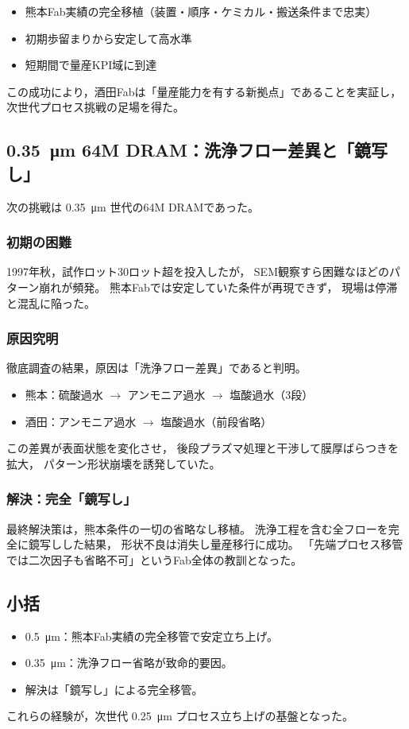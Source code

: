 \documentclass[conference]{IEEEtran}
\let\meter\metre
\begin{document}
\begin{itemize}
  \item 熊本Fab実績の完全移植（装置・順序・ケミカル・搬送条件まで忠実）
  \item 初期歩留まりから安定して高水準
  \item 短期間で量産KPI域に到達
\end{itemize}

この成功により，酒田Fabは「量産能力を有する新拠点」であることを実証し，
次世代プロセス挑戦の足場を得た。

\subsection{\SI{0.35}{\micro\meter} 64M DRAM：洗浄フロー差異と「鏡写し」}
次の挑戦は \SI{0.35}{\micro\meter} 世代の64M DRAMであった。

\subsubsection*{初期の困難}
1997年秋，試作ロット30ロット超を投入したが，
SEM観察すら困難なほどのパターン崩れが頻発。
熊本Fabでは安定していた条件が再現できず，
現場は停滞と混乱に陥った。

\subsubsection*{原因究明}
徹底調査の結果，原因は「洗浄フロー差異」であると判明。  
\begin{itemize}
  \item 熊本：硫酸過水 $\rightarrow$ アンモニア過水 $\rightarrow$ 塩酸過水（3段）
  \item 酒田：アンモニア過水 $\rightarrow$ 塩酸過水（前段省略）
\end{itemize}

この差異が表面状態を変化させ，
後段プラズマ処理と干渉して膜厚ばらつきを拡大，
パターン形状崩壊を誘発していた。

\subsubsection*{解決：完全「鏡写し」}
最終解決策は，熊本条件の一切の省略なし移植。
洗浄工程を含む全フローを完全に鏡写しした結果，
形状不良は消失し量産移行に成功。
「先端プロセス移管では二次因子も省略不可」というFab全体の教訓となった。

\subsection{小括}
\begin{itemize}
  \item \SI{0.5}{\micro\meter}：熊本Fab実績の完全移管で安定立ち上げ。
  \item \SI{0.35}{\micro\meter}：洗浄フロー省略が致命的要因。
  \item 解決は「鏡写し」による完全移管。
\end{itemize}
これらの経験が，次世代 \SI{0.25}{\micro\meter} プロセス立ち上げの基盤となった。
\end{document}
